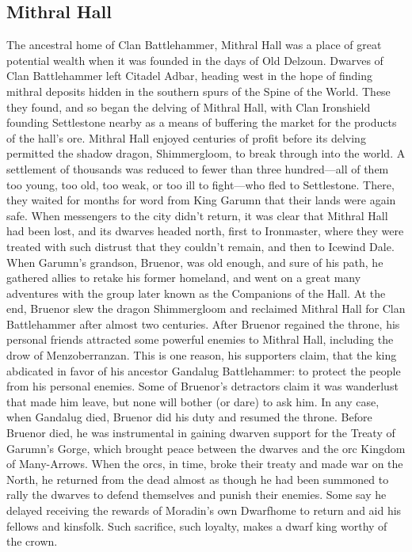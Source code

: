 \documentclass[10pt,a4paper,twoside,twocolumn,openany,bg=print,nodeprecatedcode]{dndbook}
\begin{document}
\subsection{Mithral Hall}
The ancestral home of Clan Battlehammer, Mithral Hall was a place of great potential wealth when it was founded in the days of Old Delzoun. Dwarves of Clan Battlehammer left Citadel Adbar, heading west in the hope of finding mithral deposits hidden in the southern spurs of the Spine of the World. These they found, and so began the delving of Mithral Hall, with Clan Ironshield founding Settlestone nearby as a means of buffering the market for the products of the hall's ore.
Mithral Hall enjoyed centuries of profit before its delving permitted the shadow dragon, Shimmergloom, to break through into the world. A settlement of thousands was reduced to fewer than three hundred—all of them too young, too old, too weak, or too ill to fight—who fled to Settlestone. There, they waited for months for word from King Garumn that their lands were again safe. When messengers to the city didn't return, it was clear that Mithral Hall had been lost, and its dwarves headed north, first to Ironmaster, where they were treated with such distrust that they couldn't remain, and then to Icewind Dale.
When Garumn's grandson, Bruenor, was old enough, and sure of his path, he gathered allies to retake his former homeland, and went on a great many adventures with the group later known as the Companions of the Hall. At the end, Bruenor slew the dragon Shimmergloom and reclaimed Mithral Hall for Clan Battlehammer after almost two centuries.
After Bruenor regained the throne, his personal friends attracted some powerful enemies to Mithral Hall, including the drow of Menzoberranzan. This is one reason, his supporters claim, that the king abdicated in favor of his ancestor Gandalug Battlehammer: to protect the people from his personal enemies. Some of Bruenor's detractors claim it was wanderlust that made him leave, but none will bother (or dare) to ask him. In any case, when Gandalug died, Bruenor did his duty and resumed the throne.
Before Bruenor died, he was instrumental in gaining dwarven support for the Treaty of Garumn's Gorge, which brought peace between the dwarves and the orc Kingdom of Many-Arrows. When the orcs, in time, broke their treaty and made war on the North, he returned from the dead almost as though he had been summoned to rally the dwarves to defend themselves and punish their enemies. Some say he delayed receiving the rewards of Moradin's own Dwarfhome to return and aid his fellows and kinsfolk. Such sacrifice, such loyalty, makes a dwarf king worthy of the crown.
\end{document}

